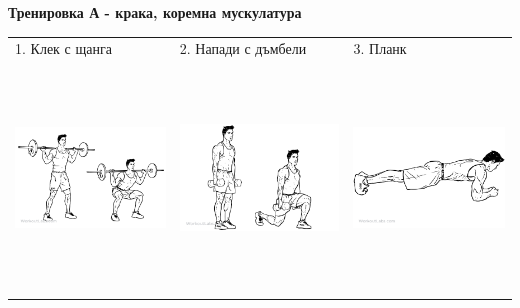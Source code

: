 \documentclass{article}
\begin{document}
\centering
\textbf{Тренировка А - крака, коремна мускулатура}\\
\begin{tabular}{ | m{5cm} | m{5cm} | m{5cm} | }
\hline
1. Клек с щанга & 2. Напади с дъмбели & 3. Планк \\ 
\begin{minipage}{5cm} \includegraphics[width=\linewidth, height=60mm]{Barbell-Squat.png}\end{minipage}&
\begin{minipage}{5cm} \includegraphics[width=\linewidth, height=60mm]{Dumbbell_Lunges.png} \end{minipage}& 
\begin{minipage}{5cm} \includegraphics[width=\linewidth, height=60mm]{front-plank.png} \end{minipage}\\ 

\end{tabular}
\end{document}
